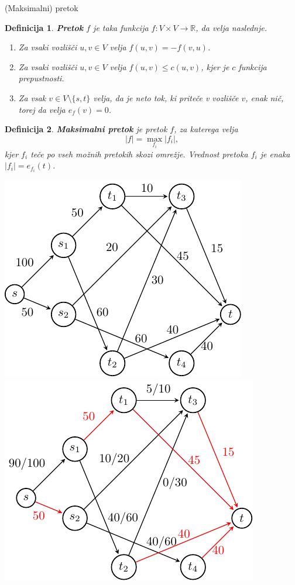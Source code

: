 \documentclass{beamer}
\newtheorem{definicija}{Definicija}
\begin{document}
\begin{frame}{(Maksimalni) pretok}
    \begin{definicija}
    \textbf{Pretok} $f$ je taka funkcija $f\colon V \times V \rightarrow \mathbb{R}$, da velja naslednje.
    \begin{enumerate}
        \item Za vsaki vozlišči $u,v \in V$ velja $f(u,v) = - f(v,u)$.
        \item Za vsaki vozlišči $u,v \in V$ velja $f(u,v) \leq c(u,v)$, kjer je $c$ funkcija prepustnosti.
        \item Za vsak $v \in V \setminus\{s,t\}$ velja, da je neto tok, ki priteče v vozlišče $v$, enak nič, torej da velja $e_f(v) = 0$.
    \end{enumerate}
    \end{definicija}

    \begin{definicija}
    \textbf{Maksimalni pretok} je pretok $f$, za katerega velja \[|f| = \max_{f_i} |f_i|,\] kjer $f_i$ teče po vseh možnih pretokih skozi omrežje.
    Vrednost pretoka $f_i$ je enaka $|f_i| = e_{f_i}(t)$.
    \end{definicija}
\end{frame}

\begin{frame}
    \centering
    \includegraphics[scale=0.7]{../writing/images/primer1-1.pdf}~~~
    \includegraphics[scale=0.7]{../writing/images/primer1-3.pdf}
\end{frame}
\end{document}
